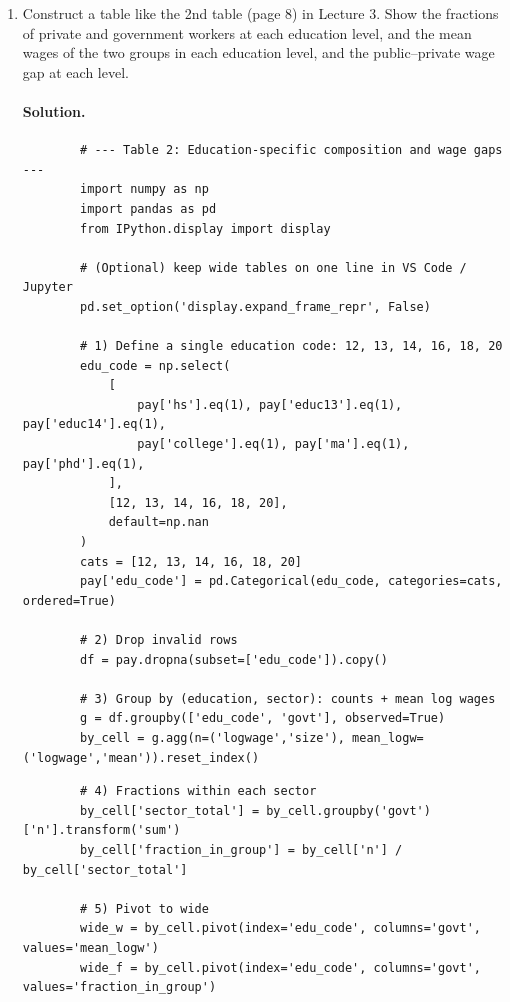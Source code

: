 \documentclass[12pt]{article}
\numberwithin{equation}{section}
\newcommand{\solution}{\paragraph{Solution.}}
\begin{document}
\begin{enumerate}[leftmargin=2em]
  \item Construct a table like the 2nd table (page 8) in Lecture 3. Show the fractions of private and government workers at each education level, and the mean wages of the two groups in each education level, and the public--private wage gap at each level.
    
    \solution
    \begin{listing}[H]
        \begin{verbatim}
        # --- Table 2: Education-specific composition and wage gaps ---
        import numpy as np
        import pandas as pd
        from IPython.display import display
        
        # (Optional) keep wide tables on one line in VS Code / Jupyter
        pd.set_option('display.expand_frame_repr', False)
        
        # 1) Define a single education code: 12, 13, 14, 16, 18, 20
        edu_code = np.select(
            [
                pay['hs'].eq(1), pay['educ13'].eq(1), pay['educ14'].eq(1),
                pay['college'].eq(1), pay['ma'].eq(1), pay['phd'].eq(1),
            ],
            [12, 13, 14, 16, 18, 20],
            default=np.nan
        )
        cats = [12, 13, 14, 16, 18, 20]
        pay['edu_code'] = pd.Categorical(edu_code, categories=cats, ordered=True)
        
        # 2) Drop invalid rows
        df = pay.dropna(subset=['edu_code']).copy()
        
        # 3) Group by (education, sector): counts + mean log wages
        g = df.groupby(['edu_code', 'govt'], observed=True)
        by_cell = g.agg(n=('logwage','size'), mean_logw=('logwage','mean')).reset_index()
        \end{verbatim}
        \caption{Code (Part 1): Setup, education codes, grouping.}
        \end{listing}
        
        
        \begin{listing}[H]
        \begin{verbatim}
        # 4) Fractions within each sector
        by_cell['sector_total'] = by_cell.groupby('govt')['n'].transform('sum')
        by_cell['fraction_in_group'] = by_cell['n'] / by_cell['sector_total']
        
        # 5) Pivot to wide
        wide_w = by_cell.pivot(index='edu_code', columns='govt', values='mean_logw')
        wide_f = by_cell.pivot(index='edu_code', columns='govt', values='fraction_in_group')
        

\end{verbatim}
\end{listing}
\end{enumerate}
\end{document}
